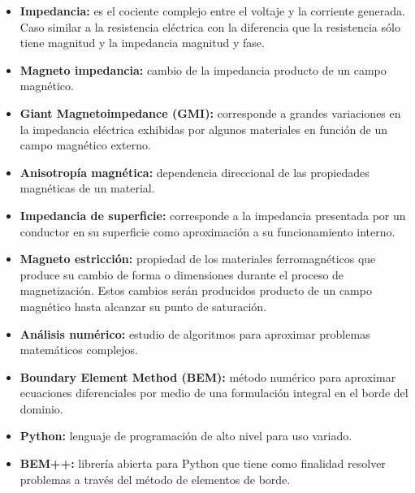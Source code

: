 \begin{itemize}
	\item \textbf{Impedancia:} es el cociente complejo entre el voltaje y la corriente generada. Caso similar a la resistencia eléctrica con la diferencia que la resistencia sólo tiene magnitud y la impedancia magnitud y fase.
	\item \textbf{Magneto impedancia:} cambio de la impedancia producto de un campo magnético.
	\item \textbf{Giant Magnetoimpedance (GMI):} corresponde a grandes variaciones en la impedancia eléctrica exhibidas por algunos materiales en función de un campo magnético externo.
	\item \textbf{Anisotropía magnética:} dependencia direccional de las propiedades magnéticas de un material.
	\item \textbf{Impedancia de superficie:} corresponde a la impedancia presentada por un conductor en su superficie como aproximación a su funcionamiento interno. 
	\item \textbf{Magneto estricción:} propiedad de los materiales ferromagnéticos que produce su cambio de forma o dimensiones durante el proceso de magnetización. Estos cambios serán producidos producto de un campo magnético hasta alcanzar su punto de saturación.
	\item \textbf{Análisis numérico:} estudio de algoritmos para aproximar problemas matemáticos complejos.
	\item \textbf{Boundary Element Method (BEM):} método numérico para aproximar ecuaciones diferenciales por medio de una formulación integral en el borde del dominio.
	\item \textbf{Python:} lenguaje de programación de alto nivel para uso variado.
	\item \textbf{BEM++:} librería abierta para Python que tiene como finalidad resolver problemas a través del método de elementos de borde.	
\end{itemize}
